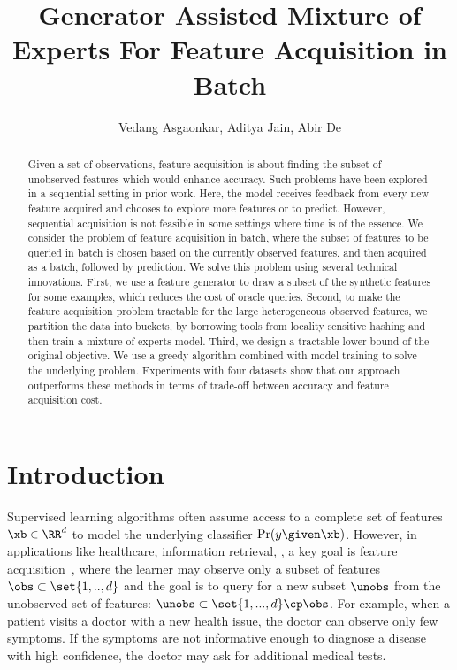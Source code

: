 \documentclass[letterpaper]{article}
\title{Generator Assisted  Mixture of Experts  For Feature Acquisition in Batch}
\author{
    Vedang Asgaonkar, Aditya Jain, Abir De
}
\renewcommand{\cite}{\citep}
\begin{document}


\maketitle


\begin{abstract}
Given a set of observations, feature acquisition is about finding the subset of unobserved features which would enhance accuracy. Such problems have been explored in a sequential setting in prior work. Here, the model receives feedback from every new feature acquired and chooses to explore more features or to predict. However, sequential acquisition is not feasible in some settings where time is of the essence. We consider the problem of feature acquisition in batch, where the subset of features to be queried in batch is chosen based on the currently observed features, and then acquired as a batch, followed by prediction. We solve this problem using several technical innovations. First, we use a feature generator to draw a subset of the synthetic features for some examples, which reduces the cost of oracle queries. Second, to make the feature acquisition problem tractable for the large heterogeneous observed features, we partition the data into buckets, by borrowing tools from locality sensitive hashing and then train a mixture of experts model. Third, we design a tractable lower bound of the original objective.
We use a greedy algorithm combined with model training to solve the underlying problem.
Experiments with four datasets show that our approach outperforms these methods in terms of trade-off between accuracy and feature acquisition cost.
\end{abstract}



 \section{Introduction}


Supervised learning algorithms often assume access to a complete set of features $\xb \in \RR^d$
to model the underlying classifier $\Pr(y\given \xb)$.
However, in applications like healthcare, information retrieval, \etc, a key goal is feature acquisition~\cite{babu2016wrapper, geng2007feature}, where the learner may observe only a subset of features $\obs \subset \set{1,..,d}$ and the goal is to query for a new subset $\unobs$ from the unobserved set of features: $\unobs \subset \set{1,...,d} \cp \obs$. For example, when a patient visits a doctor with a new health issue, the doctor can observe only few symptoms. If the symptoms are not informative enough to diagnose a disease with high confidence, the doctor may ask for additional medical tests.
\end{document}
